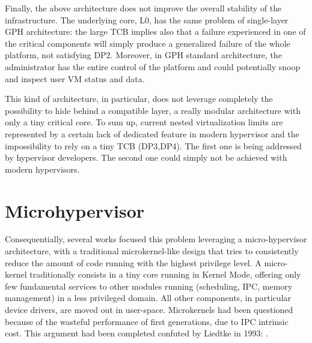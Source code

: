 \documentclass{sig-alternate}
\begin{document}
Finally, the above architecture does not improve the overall stability of the infrastructure. The underlying core, L0, has the same problem of single-layer GPH architecture: the large TCB implies also that a failure experienced in one of the critical components will simply produce a generalized failure of the whole platform, not satisfying DP2. Moreover, in GPH standard architecture, the administrator has the entire control of the platform and could potentially snoop and inspect user VM status and data.

This kind of architecture, in particular, does not leverage completely the possibility to hide behind a compatible layer, a really modular architecture with only a tiny critical core.
To sum up, current nested virtualization limits are represented by a certain lack of dedicated feature in modern hypervisor and the impossibility to rely on a tiny TCB (DP3,DP4).
The first one is being addressed by hypervisor developers. The second one could simply not be achieved with modern hypervisors. 

\section{Microhypervisor}
\label{sec:mh}


Consequentially, several works focused this problem leveraging a micro-hypervisor architecture, with a traditional microkernel-like design that tries to consistently reduce the amount of code running with the highest privilege level. A micro-kernel traditionally consists in a tiny core running in Kernel Mode, offering only few fundamental services to other modules running (scheduling, IPC, memory management) in a less privileged domain. All other components, in particular device drivers, are moved out in user-space.
Microkernels had been questioned because of the wasteful performance of first generations, due to IPC intrinsic cost. This argument had been completed confuted by Liedtke in 1993: \cite{liedtke1993ImpIPCbyKerDes,liedtke1995micCon}.
\end{document}
